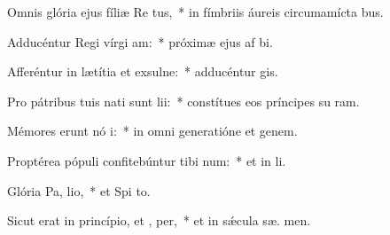 \item Omnis glória ejus fíliæ Re  tus,~* in fímbriis áureis circumamícta bus.
\item Adducéntur Regi vírgi  am:~* próximæ ejus af bi.
\item Afferéntur in lætítia et exsulne:~* adducéntur   gis.
\item Pro pátribus tuis nati sunt  lii:~* constítues eos príncipes su  ram.
\item Mémores erunt nó i:~* in omni generatióne et genem.
\item Proptérea pópuli confitebúntur tibi  num:~* et in  li.
\item Glória Pa,  lio,~* et Spi to.
\item Sicut erat in princípio, et ,  per,~* et in sǽcula sæ. men.
